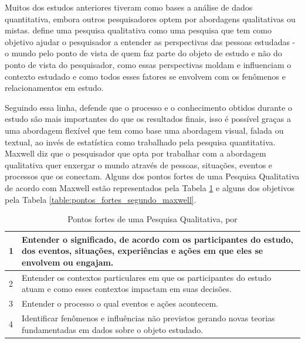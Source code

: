 Muitos dos estudos anteriores tiveram como bases a análise de dados quantitativa, embora outros pesquisadores optem por abordagens qualitativas ou mistas.  define uma pesquisa qualitativa como uma pesquisa que tem como objetivo ajudar o pesquisador a entender as perspectivas das pessoas estudadas - o mundo pelo ponto de vista de quem faz parte do objeto de estudo e não do ponto de vista do pesquisador, como essas perspectivas moldam e influenciam o contexto estudado e como todos esses fatores se envolvem com os fenômenos e relacionamentos em estudo. 

Seguindo essa linha,  defende que o processo e o conhecimento obtidos durante o estudo são mais importantes do que os resultados finais, isso é possível graças a uma abordagem flexível que tem como base uma abordagem visual, falada ou textual, ao invés de estatística como trabalhado pela pesquisa quantitativa. Maxwell diz que o pesquisador que opta por trabalhar com a abordagem qualitativa quer enxergar o mundo através de pessoas, situações, eventos e processos que os conectam. Alguns dos pontos fortes de uma Pesquisa Qualitativa de acordo com Maxwell estão representados pela Tabela \ref{table:objetivos_intelectuais_segundo_maxwell} e alguns dos objetivos pela Tabela \ref{table:pontos_fortes_segundo_maxwell}.

\begin{table}[!htb]
	\centering
	\begin{tabular}{ | p{3cm} | p{12cm} | }
		\hline
		1 & Entender o significado, de acordo com os participantes do estudo, dos eventos, situações, experiências e ações em que eles se envolvem ou engajam. \\ \hline
		2 & Entender os contextos particulares em que os participantes do estudo atuam e como esses contextos impactam em suas decisões. \\ \hline
		3 & Entender o processo o qual eventos e ações acontecem. \\ \hline
		4 & Identificar fenômenos e influências não previstos gerando novas teorias fundamentadas em dados sobre o objeto estudado. \\ \hline
	\end{tabular}
	\caption{Pontos fortes de uma Pesquisa Qualitativa, por \cite{Maxwell2013}}
	\label{table:objetivos_intelectuais_segundo_maxwell}
\end{table}

